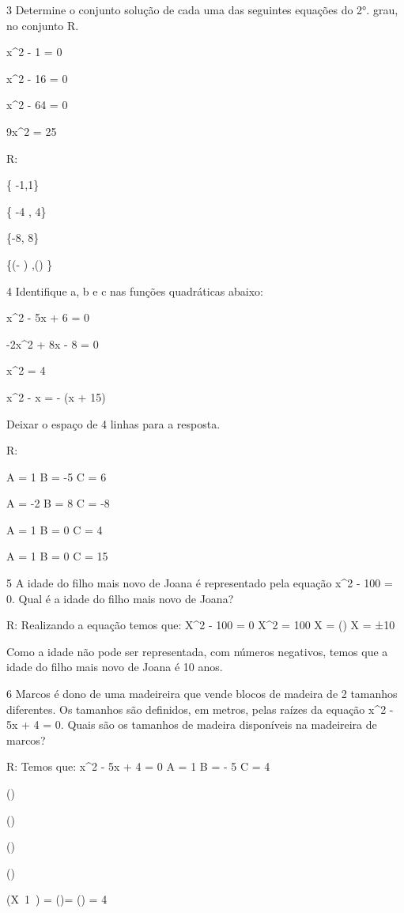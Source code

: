 {\num{3} Determine o conjunto solução de cada uma das seguintes equações do
2°. grau, no conjunto R.
\item x^2 - 1 = 0
\item x^2 - 16 = 0
\item x^2 - 64 = 0
\item 9x^2 = 25

R:
\item \{ -1,1\}
\item \{ -4 , 4\}
\item \{-8, 8\}
\item \{(- ) ,() \}

\num{4} Identifique a, b e c nas funções quadráticas abaixo:
\item x^2 - 5x + 6 = 0
\item -2x^2 + 8x - 8 = 0
\item x^2 = 4
\item x^2 - x = - (x + 15)

Deixar o espaço de 4 linhas para a resposta.

R:
\item
A = 1
B = -5
C = 6
\item
A = -2
B = 8
C = -8
\item
A = 1
B = 0
C = 4
\item
A = 1
B = 0
C = 15

\num{5} A idade do filho mais novo de Joana é representado pela equação x^2 -
100 = 0. Qual é a idade do filho mais novo de Joana?

R: Realizando a equação temos que:
X^2 - 100 = 0
X^2 = 100
X = ()
X = ±10

Como a idade não pode ser representada, com números negativos, temos que
a idade do filho mais novo de Joana é 10 anos.

\num{6} Marcos é dono de uma madeireira que vende blocos de madeira de 2
tamanhos diferentes. Os tamanhos são definidos, em metros, pelas raízes
da equação x^2 - 5x + 4 = 0. Quais são os tamanhos de madeira disponíveis
na madeireira de marcos?

R: Temos que: x^2 - 5x + 4 = 0
A = 1
B = - 5
C = 4

()

()

()

()

(X~1~) = ()= () = 4

}
